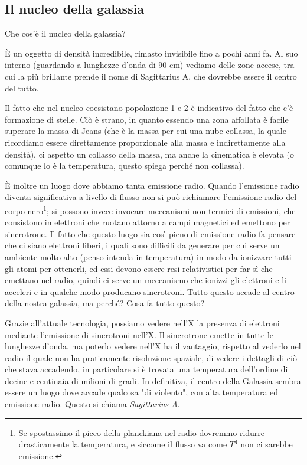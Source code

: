 \subsection{Il nucleo della galassia}
Che cos'è il nucleo della galassia?

È un oggetto di densità incredibile, rimasto invisibile fino a pochi anni fa. Al suo interno (guardando a lunghezze d'onda di 90 cm) vediamo delle zone accese, tra cui la più brillante prende il nome di Sagittarius A, che dovrebbe essere il centro del tutto.

Il fatto che nel nucleo coesistano popolazione 1 e 2 è indicativo del fatto che c'è formazione di stelle. Ciò è strano, in quanto essendo una zona affollata è facile superare la massa di Jeans (che è la massa per cui una nube collassa, la quale ricordiamo essere direttamente proporzionale alla massa e indirettamente alla densità), ci aspetto un collasso della massa, ma anche la cinematica è elevata (o comunque lo è la temperatura, questo spiega perché non collassa).

È inoltre un luogo dove abbiamo tanta emissione radio. Quando l'emissione radio diventa significativa a livello di flusso non si può richiamare l'emissione radio del corpo nero\footnote{Se spostassimo il picco della planckiana nel radio dovremmo ridurre drasticamente la temperatura, e siccome il flusso va come $T^4$ non ci sarebbe emissione.}; si possono invece invocare meccanismi non termici di emissioni, che consistono in elettroni che ruotano attorno a campi magnetici ed emettono per sincrotrone. Il fatto che questo luogo sia così pieno di emissione radio fa pensare che ci siano elettroni liberi, i quali sono difficili da generare per cui serve un ambiente molto alto (penso intenda in temperatura) in modo da ionizzare tutti gli atomi per ottenerli, ed essi devono essere resi relativistici per far sì che emettano nel radio, quindi ci serve un meccanismo che ionizzi gli elettroni e li acceleri e in qualche modo producano sincrotroni. Tutto questo accade al centro della nostra galassia, ma perché? Cosa fa tutto questo?

Grazie all'attuale tecnologia, possiamo vedere nell'X la presenza di elettroni mediante l'emissione di sincrotroni nell'X. Il sincrotrone emette in tutte le lunghezze d'onda, ma poterlo vedere nell'X ha il vantaggio, rispetto al vederlo nel radio il quale non ha praticamente risoluzione spaziale, di vedere i dettagli di ciò che stava accadendo, in particolare si è trovata una temperatura dell'ordine di decine e centinaia di milioni di gradi. In definitiva, il centro della Galassia sembra essere un luogo dove accade qualcosa "di violento", con alta temperatura ed emissione radio. Questo si chiama \textit{Sagittarius A}.

